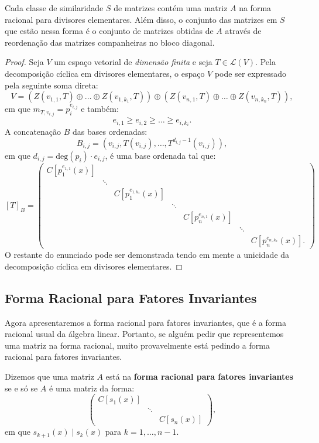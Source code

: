 \documentclass[11pt,twoside,a4paper]{book}
\begin{document}
\begin{teorema}
Cada classe de similaridade $S$ de matrizes contém uma matriz $A$ na forma racional para divisores elementares. Além disso, o conjunto das matrizes em $S$ que estão nessa forma
é o conjunto de matrizes obtidas de $A$ através de reordenação das matrizes companheiras no bloco diagonal.
\end{teorema}
\begin{proof}
Seja $V$ um espaço vetorial de \emph{dimensão finita} e seja $T\in\mathcal{L}(V)$. Pela decomposição cíclica em divisores elementares, o espaço $V$ pode ser expressado pela seguinte soma direta:
\[
V=\left(Z(v_{1,1},T)\oplus\dots\oplus Z(v_{1,k_1},T)\right)\oplus\left(Z(v_{n,1},T)\oplus\dots\oplus Z(v_{n,k_n},T)\right),
\]
em que $m_{T,v_{i,j}}=p_i^{e_{i,j}}$ e também:
\[
e_{i,1}\geq e_{i,2}\geq\dots\geq e_{i,k_i}.
\]
A concatenação $B$ das bases ordenadas:
\[
B_{i,j}=\left(v_{i,j},T(v_{i,j}),\dots,T^{d_{i,j}-1}(v_{i,j})\right),
\]
em que $d_{i,j}=\mathrm{deg}(p_i)\cdot e_{i,j}$, é uma base ordenada tal que:
\[
[T]_B=\begin{pmatrix}
C[p_1^{e_{1,1}}(x)]&&&&&&\\&\ddots&&&&&\\&&C[p_1^{e_{1,k_1}}(x)]&&&&\\&&&\ddots&&&\\&&&&C[p_n^{e_{n,1}}(x)]&&\\&&&&&\ddots&\\&&&&&&C[p_n^{e_{n,k_n}}(x)].
\end{pmatrix}
\]
O restante do enunciado pode ser demonstrada tendo em mente a unicidade da decomposição cíclica em divisores elementares.
\end{proof}

\subsection{Forma Racional para Fatores Invariantes}

Agora apresentaremos a forma racional para fatores invariantes, que é a forma racional usual da álgebra linear. Portanto, se alguém pedir que representemos uma matriz na forma racional, muito provavelmente está pedindo a forma racional para fatores invariantes.

\begin{definicao}
Dizemos que uma matriz $A$ está na \textbf{forma racional para fatores invariantes} se e só se $A$ é uma matriz da forma:
\[
\begin{pmatrix}
C[s_1(x)]&&\\&\ddots&\\&&C[s_n(x)]
\end{pmatrix},
\]
em que $s_{k+1}(x)\mid s_k(x)$ para $k=1,\dots,n-1$.
\end{definicao}
\end{document}
